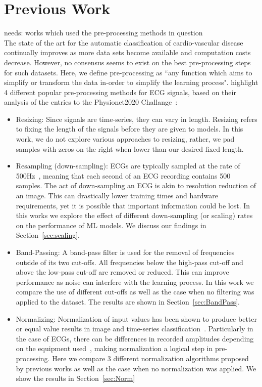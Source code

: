 \documentclass[pmlr,twocolumn]{jmlr}%
\begin{document}
\section{Previous Work}
{\color{red} needs: works which used the pre-processing methods in question}\\
\label{sec:prevwork}
The state of the art for the automatic classification of cardio-vascular disease continually improves as more data sets become available and computation costs decrease. However, no consensus seems to exist on the best pre-processing steps for such datasets. Here, we define pre-processing as ``any function which aims to simplify or transform the data in-order to simplify the learning process". \cite{hong2022practical} highlight 4 different popular pre-processing methods for ECG signals, based on their analysis of the entries to the Physionet2020 Challange~\cite{goldberger2000physiobank,alday2020classification}:
\begin{itemize}
    \item Resizing: Since signals are time-series, they can vary in length. Resizing refers to fixing the length of the signals before they are given to models. In this work, we do not explore various approaches to resizing, rather, we pad samples with zeros on the right when lower than our desired fixed length. 
    \item Resampling (down-sampling): ECGs are typically sampled at the rate of 500Hz~\cite{luo2010review,uwaechia2021comprehensive}, meaning that each second of an ECG recording contains 500 samples. The act of down-sampling an ECG is akin to resolution reduction of an image. This can drastically lower training times and hardware requirements, yet it is possible that important information could be lost. In this works we explore the effect of different down-sampling (or scaling) rates on the performance of ML models. We discuss our findings in Section~\ref{sec:scaling}. 
    \item Band-Passing: A band-pass filter is used for the removal of frequencies outside of its two cut-offs. All frequencies below the high-pass cut-off and above the low-pass cut-off are removed or reduced. This can improve performance as noise can interfere with the learning process. In this work we compare the use of different cut-offs as well as the case when no filtering was applied to the dataset. The results are shown in Section~\ref{sec:BandPass}.
    \item Normalizing: Normalization of input values has been shown to produce better or equal value results in image and time-series classification~\cite{bhanja2018impact}. Particularly in the case of ECGs, there can be differences in recorded amplitudes depending on the equipment used~\cite{uwaechia2021comprehensive}, making normalization a logical step in pre-processing. Here we compare 3 different normalization algorithms proposed by previous works as well as the case when no normalization was applied. We show the results in Section~\ref{sec:Norm}
\end{itemize}
\end{document}
